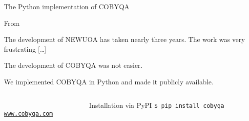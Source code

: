 \documentclass[
]{talk}
\begin{document}
\begin{frame}[fragile]{The Python implementation of COBYQA}
    \begin{block}{From \textcite{Powell_2006}}
        \begin{quoting}
            \small%
            The development of NEWUOA has taken nearly \alert{three years}.
            The work was very \alert{frustrating} [\dots]
        \end{quoting}
        The development of COBYQA was \alert{not easier}.
    \end{block}

    \medskip

    We implemented COBYQA in \alert{Python} and made it publicly available.

    \medskip

    \begin{columns}
        \begin{column}{0.4\textwidth}
            \begin{center}
                \\[1ex]
                \href{https://www.cobyqa.com}{\texttt{www.cobyqa.com}}
            \end{center}
        \end{column}
        \begin{column}{0.6\textwidth}
            \begin{block}{Installation via PyPI}
                \texttt{\$ pip install cobyqa}
            \end{block}
        \end{column}
    \end{columns}
\end{frame}
\end{document}
